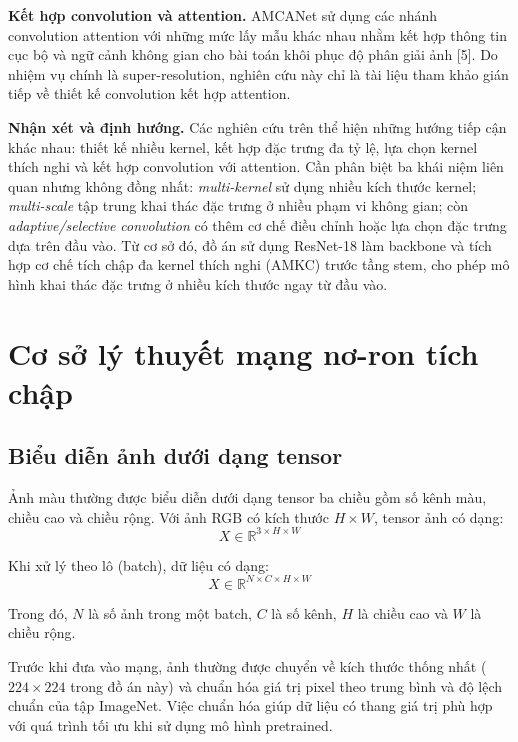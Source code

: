 \textbf{Kết hợp convolution và attention.} AMCANet sử dụng các nhánh convolution attention với những mức lấy mẫu khác nhau nhằm kết hợp thông tin cục bộ và ngữ cảnh không gian cho bài toán khôi phục độ phân giải ảnh [5]. Do nhiệm vụ chính là super-resolution, nghiên cứu này chỉ là tài liệu tham khảo gián tiếp về thiết kế convolution kết hợp attention.

\textbf{Nhận xét và định hướng.} Các nghiên cứu trên thể hiện những hướng tiếp cận khác nhau: thiết kế nhiều kernel, kết hợp đặc trưng đa tỷ lệ, lựa chọn kernel thích nghi và kết hợp convolution với attention. Cần phân biệt ba khái niệm liên quan nhưng không đồng nhất: \textit{multi-kernel} sử dụng nhiều kích thước kernel; \textit{multi-scale} tập trung khai thác đặc trưng ở nhiều phạm vi không gian; còn \textit{adaptive/selective convolution} có thêm cơ chế điều chỉnh hoặc lựa chọn đặc trưng dựa trên đầu vào. Từ cơ sở đó, đồ án sử dụng ResNet-18 làm backbone và tích hợp cơ chế tích chập đa kernel thích nghi (AMKC) trước tầng stem, cho phép mô hình khai thác đặc trưng ở nhiều kích thước ngay từ đầu vào.

\section{Cơ sở lý thuyết mạng nơ-ron tích chập}

\subsection{Biểu diễn ảnh dưới dạng tensor}

Ảnh màu thường được biểu diễn dưới dạng tensor ba chiều gồm số kênh màu, chiều cao và chiều rộng. Với ảnh RGB có kích thước $H\times W$, tensor ảnh có dạng:
\begin{equation}
  X\in\mathbb{R}^{3\times H\times W}
\end{equation}

Khi xử lý theo lô (batch), dữ liệu có dạng:
\begin{equation}
  X\in\mathbb{R}^{N\times C\times H\times W}
\end{equation}

Trong đó, $N$ là số ảnh trong một batch, $C$ là số kênh, $H$ là chiều cao và $W$ là chiều rộng.

Trước khi đưa vào mạng, ảnh thường được chuyển về kích thước thống nhất ($224\times224$ trong đồ án này) và chuẩn hóa giá trị pixel theo trung bình và độ lệch chuẩn của tập ImageNet. Việc chuẩn hóa giúp dữ liệu có thang giá trị phù hợp với quá trình tối ưu khi sử dụng mô hình pretrained.

